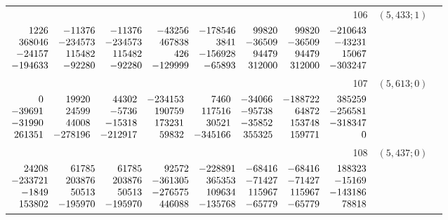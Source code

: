 \documentclass[11pt]{article}
\theoremstyle{remark}
\numberwithin{equation}{section}
\begin{document}
\begin{longtable}{rcl}
106 & $(5,433;1)$ & \begin{tabular}[t]{@{}l@{}}$w_i=\displaystyle \frac{7504571763760729033}{3651000141710658034964000000000000000}$\\[3pt]{\scriptsize$\begin{array}{@{}rrrrrrrr@{}}1226 & -11376 & -11376 & -43256 & -178546 & 99820 & 99820 & -210643\\368046 & -234573 & -234573 & 467838 & 3841 & -36509 & -36509 & -43231\\-24157 & 115482 & 115482 & 426 & -156928 & 94479 & 94479 & 15067\\-194633 & -92280 & -92280 & -129999 & -65893 & 312000 & 312000 & -303247\end{array}$}\end{tabular}\\[8pt]
107 & $(5,613;0)$ & \begin{tabular}[t]{@{}l@{}}$w_i=\displaystyle \frac{8592577785919841}{21856521898888953600000000000000000}$\\[3pt]{\scriptsize$\begin{array}{@{}rrrrrrrr@{}}0 & 19920 & 44302 & -234153 & 7460 & -34066 & -188722 & 385259\\-39691 & 24599 & -5736 & 190759 & 117516 & -95738 & 64872 & -256581\\-31990 & 44008 & -15318 & 173231 & 30521 & -35852 & 153748 & -318347\\261351 & -278196 & -212917 & 59832 & -345166 & 355325 & 159771 & 0\end{array}$}\end{tabular}\\[8pt]
108 & $(5,437;0)$ & \begin{tabular}[t]{@{}l@{}}$w_i=\displaystyle \frac{1268231699898718381}{1693509970155417627392000000000000000}$\\[3pt]{\scriptsize$\begin{array}{@{}rrrrrrrr@{}}24208 & 61785 & 61785 & 92572 & -228891 & -68416 & -68416 & 188323\\-233721 & 203876 & 203876 & -361305 & 365353 & -71427 & -71427 & -15169\\-1849 & 50513 & 50513 & -276575 & 109634 & 115967 & 115967 & -143186\\153802 & -195970 & -195970 & 446088 & -135768 & -65779 & -65779 & 78818\end{array}$}\end{tabular}\\[8pt]

\end{longtable}
\end{document}
